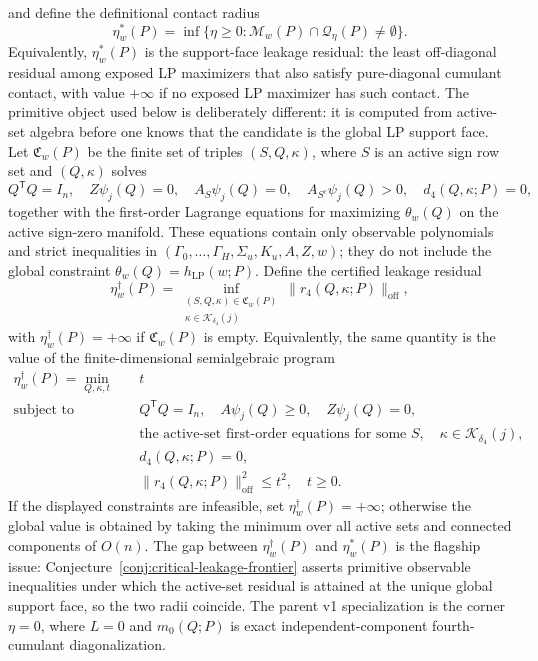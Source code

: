 \documentclass[11pt]{article}
\newcommand{\transpose}{\mathsf{T}}
\theoremstyle{definition}
\theoremstyle{plain}
\theoremstyle{remark}
\begin{document}
and define the definitional contact radius
\[
\eta_w^*(P)=
\inf\{\eta\ge0:\mathcal M_w(P)\cap\mathcal Q_\eta(P)\ne\emptyset\}.
\]
Equivalently, \(\eta_w^*(P)\) is the support-face leakage residual: the least off-diagonal residual among exposed LP maximizers that also satisfy pure-diagonal cumulant contact, with value \(+\infty\) if no exposed LP maximizer has such contact.  The primitive object used below is deliberately different: it is computed from active-set algebra before one knows that the candidate is the global LP support face.  Let \(\mathfrak C_w(P)\) be the finite set of triples \((S,Q,\kappa)\), where \(S\) is an active sign row set and \((Q,\kappa)\) solves
\[
Q^\transpose Q=I_n,\quad Z\psi_j(Q)=0,\quad A_S\psi_j(Q)=0,\quad A_{S^c}\psi_j(Q)>0,
\quad d_4(Q,\kappa;P)=0,
\]
together with the first-order Lagrange equations for maximizing \(\theta_w(Q)\) on the active sign-zero manifold.  These equations contain only observable polynomials and strict inequalities in \((\Gamma_0,\ldots,\Gamma_H,\Sigma_u,K_u,A,Z,w)\); they do not include the global constraint \(\theta_w(Q)=h_{\mathrm{LP}}(w;P)\).  Define the certified leakage residual
\[
\eta_w^\dagger(P)=
\inf_{\substack{(S,Q,\kappa)\in\mathfrak C_w(P)\\ \kappa\in\mathcal K_{\delta_4}(j)}}
\|r_4(Q,\kappa;P)\|_{\mathrm{off}},
\]
with \(\eta_w^\dagger(P)=+\infty\) if \(\mathfrak C_w(P)\) is empty.  Equivalently, the same quantity is the value of the finite-dimensional semialgebraic program
\[
\begin{aligned}
\eta_w^\dagger(P)=\min_{Q,\kappa,t}\quad & t\\
\text{subject to}\quad
& Q^\transpose Q=I_n,\quad A\psi_j(Q)\ge0,\quad Z\psi_j(Q)=0,\\
& \text{the active-set first-order equations for some }S,\quad \kappa\in\mathcal K_{\delta_4}(j),\\
& d_4(Q,\kappa;P)=0,\\
& \|r_4(Q,\kappa;P)\|_{\mathrm{off}}^2\le t^2,\quad t\ge0 .
\end{aligned}
\]
If the displayed constraints are infeasible, set \(\eta_w^\dagger(P)=+\infty\); otherwise the global value is obtained by taking the minimum over all active sets and connected components of \(O(n)\).  The gap between \(\eta_w^\dagger(P)\) and \(\eta_w^*(P)\) is the flagship issue: Conjecture~\ref{conj:critical-leakage-frontier} asserts primitive observable inequalities under which the active-set residual is attained at the unique global support face, so the two radii coincide.  The parent v1 specialization is the corner \(\eta=0\), where \(L=0\) and \(m_0(Q;P)\) is exact independent-component fourth-cumulant diagonalization.
\end{document}
